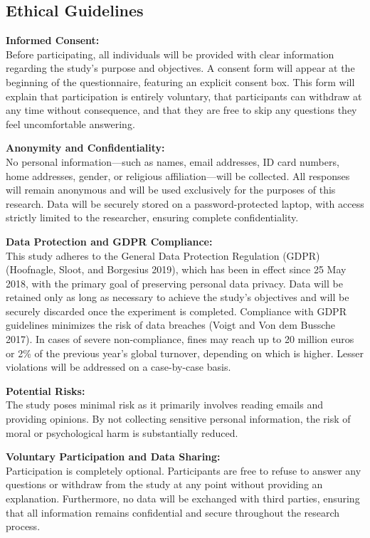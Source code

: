 \documentclass[
]{article}
\begin{document}
\subsection{Ethical Guidelines}\label{ethical-guidelines}

\textbf{Informed Consent:}\\
Before participating, all individuals will be provided with clear
information regarding the study's purpose and objectives. A consent form
will appear at the beginning of the questionnaire, featuring an explicit
consent box. This form will explain that participation is entirely
voluntary, that participants can withdraw at any time without
consequence, and that they are free to skip any questions they feel
uncomfortable answering.

\textbf{Anonymity and Confidentiality:}\\
No personal information---such as names, email addresses, ID card
numbers, home addresses, gender, or religious affiliation---will be
collected. All responses will remain anonymous and will be used
exclusively for the purposes of this research. Data will be securely
stored on a password-protected laptop, with access strictly limited to
the researcher, ensuring complete confidentiality.

\textbf{Data Protection and GDPR Compliance:}\\
This study adheres to the General Data Protection Regulation (GDPR)
(Hoofnagle, Sloot, and Borgesius 2019), which has been in effect since
25 May 2018, with the primary goal of preserving personal data privacy.
Data will be retained only as long as necessary to achieve the study's
objectives and will be securely discarded once the experiment is
completed. Compliance with GDPR guidelines minimizes the risk of data
breaches (Voigt and Von dem Bussche 2017). In cases of severe
non-compliance, fines may reach up to 20 million euros or 2\% of the
previous year's global turnover, depending on which is higher. Lesser
violations will be addressed on a case-by-case basis.

\textbf{Potential Risks:}\\
The study poses minimal risk as it primarily involves reading emails and
providing opinions. By not collecting sensitive personal information,
the risk of moral or psychological harm is substantially reduced.

\textbf{Voluntary Participation and Data Sharing:}\\
Participation is completely optional. Participants are free to refuse to
answer any questions or withdraw from the study at any point without
providing an explanation. Furthermore, no data will be exchanged with
third parties, ensuring that all information remains confidential and
secure throughout the research process.
\end{document}
